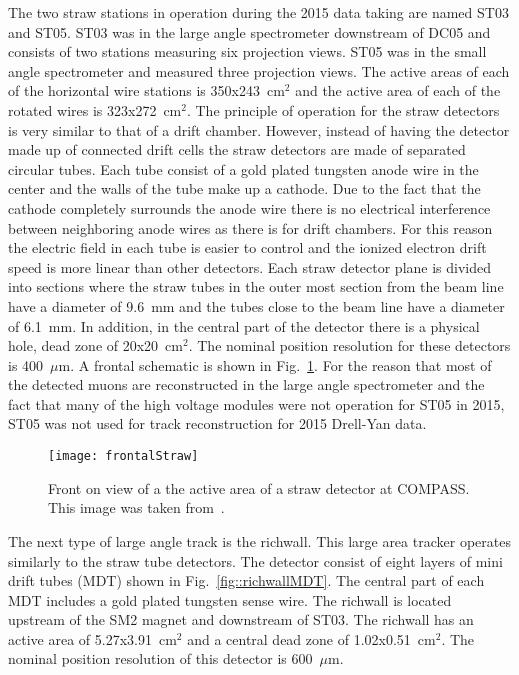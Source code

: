 The two straw stations in operation during the 2015 data taking are named ST03
and ST05.  ST03 was in the large angle spectrometer downstream of DC05 and
consists of two stations measuring six projection views.  ST05 was in the small
angle spectrometer and measured three projection views.  The active areas of
each of the horizontal wire stations is 350x243~cm$^2$ and the active area of
each of the rotated wires is 323x272~cm$^2$.  The principle of operation for the
straw detectors is very similar to that of a drift chamber.  However, instead of
having the detector made up of connected drift cells the straw detectors are
made of separated circular tubes.  Each tube consist of a gold plated tungsten
anode wire in the center and the walls of the tube make up a cathode.  Due to
the fact that the cathode completely surrounds the anode wire there is no
electrical interference between neighboring anode wires as there is for drift
chambers.  For this reason the electric field in each tube is easier to control
and the ionized electron drift speed is more linear than other detectors.  Each
straw detector plane is divided into sections where the straw tubes in the outer
most section from the beam line have a diameter of 9.6~mm and the tubes close to
the beam line have a diameter of 6.1~mm.  In addition, in the central part of
the detector there is a physical hole, dead zone of 20x20~cm$^2$.  The nominal
position resolution for these detectors is 400~$\mu$m.  A frontal schematic is
shown in Fig.~\ref{fig::frontalStraw}.  For the reason that most of the detected
muons are reconstructed in the large angle spectrometer and the fact that many
of the high voltage modules were not operation for ST05 in 2015, ST05 was not
used for track reconstruction for 2015 Drell-Yan data. \par

\begin{figure}[h!t]
  \centering
  \texttt{[image: frontalStraw]}
  \caption{Front on view of a the active area of a straw detector at COMPASS.
    This image was taken from~\cite{compassSpec}.}
  \label{fig::frontalStraw}
\end{figure}

The next type of large angle track is the richwall.  This large area tracker
operates similarly to the straw tube detectors.  The detector consist of eight
layers of mini drift tubes (MDT) shown in Fig.~\ref{fig::richwallMDT}.  The
central part of each MDT includes a gold plated tungsten sense wire.  The
richwall is located upstream of the SM2 magnet and downstream of ST03.  The
richwall has an active area of 5.27x3.91~cm$^2$ and a central dead zone of
1.02x0.51~cm$^2$.  The nominal position resolution of this detector is
600~$\mu$m. \par

